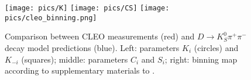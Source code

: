 \documentclass[preprint,aps,showpacs]{revtex4}
\newcommand{\dkpp}{\ensuremath{D\to K^0_S\pi^+\pi^-}\xspace}
\begin{document}
\begin{figure}[htb]
 \texttt{[image: pics/K]}
 \texttt{[image: pics/CS]}
 \texttt{[image: pics/cleo\_binning.png]}
 \caption{Comparison between CLEO measurements (red) and \dkpp decay model predictions (blue). Left: parameters $K_i$ (circles) and $K_{-i}$ (squares); middle: parameters $C_i$ and $S_i$; right: binning map according to supplementary materials to \cite{CLEO_phasees}.}
 \label{fig:CLEO_vs_Model}
\end{figure}


\end{document}
